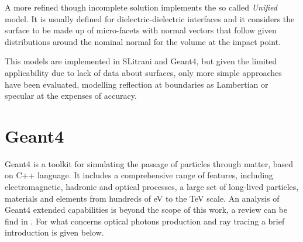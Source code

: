 A more refined though incomplete solution implements the so called \textit{Unified} model.  
It is usually defined for dielectric-dielectric interfaces and it considers the surface to be made up of micro-facets with normal vectors that follow given distributions around the nominal normal for the volume at the impact point.

This models are implemented in SLitrani and Geant4, but given the limited applicability due to lack of data about surfaces, only more simple approaches have been evaluated, modelling reflection at boundaries as Lambertian or specular at the expenses of accuracy.

\section{Geant4}
Geant4 is a toolkit for simulating the passage of particles through matter, based on C++ language. It includes a comprehensive range of features, including electromagnetic, hadronic and optical processes, a large set of long-lived particles, materials and elements from hundreds of eV to the TeV scale.
An analysis of Geant4 extended capabilities is beyond the scope of this work, a review can be find in \cite{Agostinelli2003}.
For what concerns optical photons production and ray tracing a brief introduction is given below.

